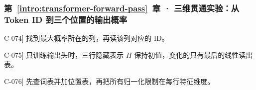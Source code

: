 \subsubsection*{第~\ref*{intro:transformer-forward-pass}~章 · 三维贯通实验：从 Token ID 到三个位置的输出概率}
\begin{answerhints}
\item[\hyperref[exercise:probability-row-greedy]{C-074}] \leavevmode{}\label{hint:probability-row-greedy}找到最大概率所在的列，再读该列对应的 ID。
\item[\hyperref[exercise:output-head-only-training]{C-075}] \leavevmode{}\label{hint:output-head-only-training}只训练输出头时，三行隐藏表示 $H$ 保持初值，变化的只有最后的线性读出表。
\item[\hyperref[exercise:causal-input-change]{C-076}] \leavevmode{}\label{hint:causal-input-change}先查词表并加位置表，再把所有归一化限制在每行特征维度。
\end{answerhints}
